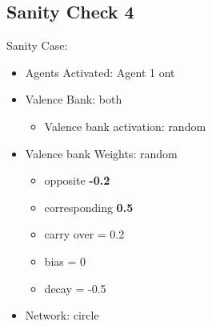 \documentclass{article}\usepackage[]{graphicx}\usepackage[]{color}
\begin{document}
\newpage
\subsection{Sanity Check 4}
\label{sec:sanity4}
Sanity Case:
\begin{itemize}
  \item Agents Activated: Agent 1 ont
  \item Valence Bank: both
  \begin{itemize}
      \item Valence bank activation: random
  \end{itemize}
  \item Valence bank Weights: random
  \begin{itemize}
      \item opposite \textbf{-0.2}
      \item corresponding \textbf{0.5}
      \item carry over = 0.2
      \item bias = 0
      \item decay = -0.5
  \end{itemize}
  \item Network: circle
\end{itemize}
\end{document}
